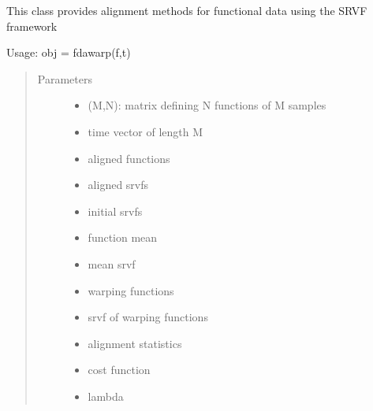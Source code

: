 \documentclass[letterpaper,10pt,english]{sphinxmanual}
\begin{document}
\begin{fulllineitems}
\label{\detokenize{time_warping:time_warping.fdawarp}}
This class provides alignment methods for functional data using the SRVF framework

Usage:  obj = fdawarp(f,t)
\begin{quote}\begin{description}
\item[{Parameters}] \leavevmode\begin{itemize}
\item {} 
 \textendash{} (M,N): matrix defining N functions of M samples

\item {} 
 \textendash{} time vector of length M

\item {} 
 \textendash{} aligned functions

\item {} 
 \textendash{} aligned srvfs

\item {} 
 \textendash{} initial srvfs

\item {} 
 \textendash{} function mean

\item {} 
 \textendash{} mean srvf

\item {} 
 \textendash{} warping functions

\item {} 
 \textendash{} srvf of warping functions

\item {} 
 \textendash{} alignment statistics

\item {} 
 \textendash{} cost function

\item {} 
 \textendash{} lambda


\end{itemize}
\end{description}
\end{quote}
\end{fulllineitems}
\end{document}
